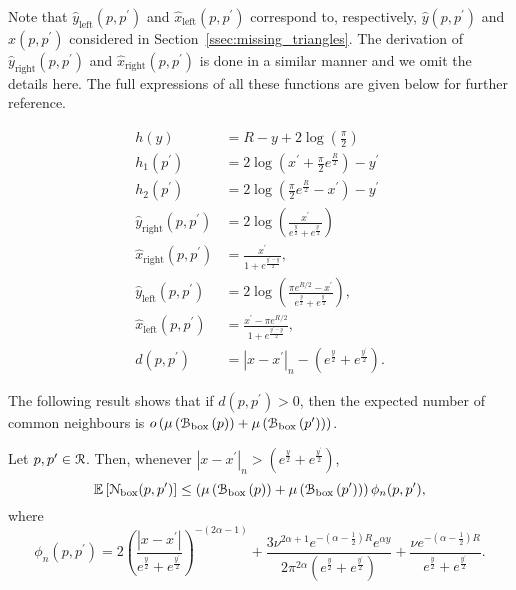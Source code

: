 Note that $\hat{y}_{\text{left}}(p,p^\prime)$ and $\hat{x}_{\text{left}}(p,p^\prime)$ correspond to, respectively, $\hat{y}(p,p^\prime)$ and $\hat{x}(p,p^\prime)$ considered in Section~\ref{ssec:missing_triangles}. The derivation of $\hat{y}_{\text{right}}(p,p^\prime)$ and $\hat{x}_{\text{right}}(p,p^\prime)$ is done in a similar manner and we omit the details here. The full expressions of all these functions are given below for further reference.

\begin{align}
	h(y) &= R - y + 2\log\left(\frac{\pi}{2}\right) \label{eq:def_height_y_P_n}\\
	h_1(p^\prime) &= 2\log\left(x^\prime + \frac{\pi}{2}e^{\frac{R}{2}}\right) - y^\prime \label{eq:def_height_left_P_n} \\
	h_2(p^\prime) &= 2\log\left(\frac{\pi}{2}e^{\frac{R}{2}} - x^\prime\right) - y^\prime 
		\label{eq:def_height_right_P_n} \\
	\hat{y}_{\text{right}}(p,p^\prime) &= 2\log\left(\frac{x^\prime}{e^{\frac{y}{2}} + e^{\frac{y^\prime}{2}}}\right)\\
	\hat{x}_{\text{right}}(p,p^\prime) &= \frac{x^\prime}{1 + 	
		e^{\frac{y^\prime - y}{2}}},\\
	\hat{y}_{\text{left}}(p,p^\prime) &= 2 \log\left(\frac{\pi e^{R/2} - x^\prime}{e^{\frac{y}{2}} + e^{\frac{y^\prime}{2}}}\right),\\
	\hat{x}_{\text{left}}(p,p^\prime) &= \frac{x^\prime - \pi e^{R/2}}{1 + e^{\frac{y^\prime - y}{2}}}, \\
	d(p,p^\prime) &= |x - x^\prime|_n - \left(e^{\frac{y}{2}} + e^{\frac{y^\prime}{2}}\right).
	\label{eq:def_d_p_p_prime}
\end{align}

The following result shows that if $d(p,p^\prime) > 0$, then the expected number of common neighbours is $o\left(\mu\left({\mathcal B}_{\text{box}}\left(p\right)\right) + \mu\left({\mathcal B}_{\text{box}}\left(p^\prime\right)\right)\right)$.

\begin{lemma}\label{lem:common_neighbours_Pcal_n}
Let $p, p^\prime \in {\mathcal R}$. Then, whenever $|x - x^\prime|_n > \left(e^{\frac{y}{2}} + e^{\frac{y^\prime}{2}}\right)$,
\[
	\mathbb{E}\left[{\mathcal N}_{\text{box}}(p,p^\prime)\right] \le \left(\mu\left({\mathcal B}_{\text{box}}\left(p\right)\right) + \mu\left({\mathcal B}_{\text{box}}\left(p^\prime\right)\right)\right)\phi_n(p,p^\prime),
\]
where
\[
	\phi_n(p,p^\prime) = 2\left(\frac{|x - x^\prime|}{e^{\frac{y}{2}} + e^{\frac{y^\prime}{2}}}\right)^{-(2\alpha - 1)} 
	+ \frac{3 \nu^{2\alpha + 1}e^{-(\alpha - \frac{1}{2})R} e^{\alpha y}}{2 \pi^{2\alpha}\left(
	e^{\frac{y}{2}} + e^{\frac{y^\prime}{2}}\right)}
	+ \frac{\nu e^{-(\alpha - \frac{1}{2})R}}{e^{\frac{y}{2}} + e^{\frac{y^\prime}{2}}}. 
\]
\end{lemma}

